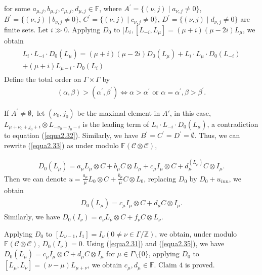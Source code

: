 \documentclass{amsart}
\theoremstyle{definition}
\theoremstyle{remark}
\numberwithin{equation}{subsection}
\numberwithin{equation}{section}
\begin{document}
for some
 $a_{\mu,j},b_{\mu,j},c_{\mu,j},d_{\mu,j}  \in
  \mathbb{F}$, where $A^{'}=\{(\nu,j)\mid a_{\nu,j}\neq 0 \}$,  $B^{'}=\{(\nu,j)\mid b_{\nu,j}\neq 0
  \}$, $C^{'}=\{(\nu,j)\mid c_{\nu,j}\neq 0 \}$, $D^{'}=\{(\nu,j)\mid d_{\nu,j}\neq 0
  \}$ are finite sets. Let $i\gg 0$. Applying $D_0$ to
  $[L_i,[L_{-i},L_\mu]=(\mu+i)(\mu-2i)L_\mu$, we obtain
\begin{eqnarray}\label{equa2.34}
\begin{split}
L_i\cdot L_{-i}\cdot D_0(L_\mu)=(\mu+i)(\mu-2i)D_0(L_\mu)+L_i\cdot
L_\mu \cdot D_0(L_{-i})\\+(\mu+i)L_{\mu-i}\cdot D_0(L_i)
\end{split}
\end{eqnarray}
Define the total order on $\Gamma\times \Gamma$ by
$$\begin{array}{l}
(\alpha,\beta)>(\alpha^{'},\beta^{'}) \Leftrightarrow \alpha>
\alpha^{'} \mbox{ \ or \ } \alpha = \alpha^{'}, \beta> \beta^{'}.
\end{array}$$

If $A^{'}\neq \emptyset,$ let $(\nu_0,j_0)$ be the maximal element
in $A{'}$, in this case, $L_{\mu+\nu_0+j_0+i}\otimes
L_{-\nu_0-j_0-i}$ is the leading term of $L_i\cdot L_{-i}\cdot
D_0(L_\mu)$, a contradiction to equation (\ref{equa2.32}).
Similarly, we have $B^{'}= C^{'}=D^{'}=\emptyset$. Thus, we can
rewrite (\ref{equa2.33}) as under modulo $\mathbb{F}(\mathcal
{C}\otimes \mathcal{C})$,

$$\begin{array}{l}
 D_0(L_{\mu})=
 a_{\mu}L_{\mu}\otimes
 C+b_{\mu}C \otimes L_{\mu}
 +c_{\mu}I_{\mu}\otimes C  +d^{(L_{\mu})}_{\mu}C \otimes
 I_{\mu}.
 \end{array}$$
Then we can denote $u=\frac{a_\mu}{\mu}L_0\otimes
C+\frac{b_\mu}{\mu}C\otimes L_0$, replacing $D_0$ by $D_0+u_{inn}$,
we obtain
\begin{eqnarray}\label{equa2.35}
\begin{split}
 D_0(L_{\mu})=c_{\mu}I_{\mu}\otimes C  +d_{\mu}C \otimes
 I_{\mu}.
\end{split}
\end{eqnarray}
 Similarly, we have $
 D_0(I_{\nu})=e_{\nu}L_{\nu}\otimes C  +f_{\nu}C \otimes
 L_{\nu}.$

Applying $D_0$ to $[L_{\nu-1},I_1]=I_\nu(0\neq \nu \in
\Gamma/\mathbb{Z})$, we obtain, under modulo $\mathbb{F} (\mathcal
{C}\otimes \mathcal {C})$, $D_0(I_{\nu})=0.$ Using (\ref{equa2.31})
and (\ref{equa2.35}), we have $ D_0(L_{\mu})=c_{\mu}I_{\mu}\otimes C
+d_{\mu}C \otimes
 I_{\mu} \mbox{ \ for \ } \mu\in \Gamma\setminus \{0\}$, applying $D_0$ to
 $[L_{\mu},L_\nu]=(\nu-\mu)L_{\mu+\nu}$, we obtain $c_\mu,d_\mu \in \mathbb{F}$.
 Claim $4$ is proved.
\end{document}
